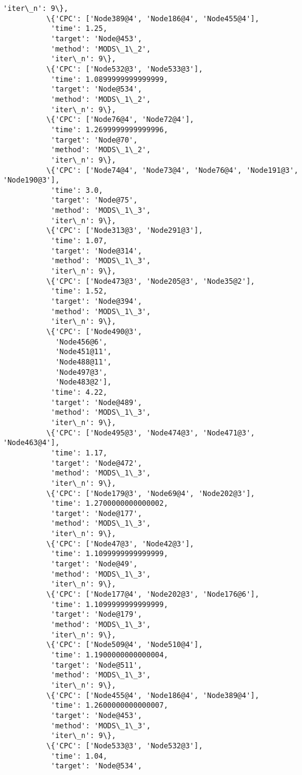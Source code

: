 \documentclass[11pt]{article}
\begin{document}
\begin{Verbatim}[commandchars=\\\{\}]
           'iter\_n': 9\},
          \{'CPC': ['Node389@4', 'Node186@4', 'Node455@4'],
           'time': 1.25,
           'target': 'Node@453',
           'method': 'MODS\_1\_2',
           'iter\_n': 9\},
          \{'CPC': ['Node532@3', 'Node533@3'],
           'time': 1.0899999999999999,
           'target': 'Node@534',
           'method': 'MODS\_1\_2',
           'iter\_n': 9\},
          \{'CPC': ['Node76@4', 'Node72@4'],
           'time': 1.2699999999999996,
           'target': 'Node@70',
           'method': 'MODS\_1\_2',
           'iter\_n': 9\},
          \{'CPC': ['Node74@4', 'Node73@4', 'Node76@4', 'Node191@3', 'Node190@3'],
           'time': 3.0,
           'target': 'Node@75',
           'method': 'MODS\_1\_3',
           'iter\_n': 9\},
          \{'CPC': ['Node313@3', 'Node291@3'],
           'time': 1.07,
           'target': 'Node@314',
           'method': 'MODS\_1\_3',
           'iter\_n': 9\},
          \{'CPC': ['Node473@3', 'Node205@3', 'Node35@2'],
           'time': 1.52,
           'target': 'Node@394',
           'method': 'MODS\_1\_3',
           'iter\_n': 9\},
          \{'CPC': ['Node490@3',
            'Node456@6',
            'Node451@11',
            'Node488@11',
            'Node497@3',
            'Node483@2'],
           'time': 4.22,
           'target': 'Node@489',
           'method': 'MODS\_1\_3',
           'iter\_n': 9\},
          \{'CPC': ['Node495@3', 'Node474@3', 'Node471@3', 'Node463@4'],
           'time': 1.17,
           'target': 'Node@472',
           'method': 'MODS\_1\_3',
           'iter\_n': 9\},
          \{'CPC': ['Node179@3', 'Node69@4', 'Node202@3'],
           'time': 1.2700000000000002,
           'target': 'Node@177',
           'method': 'MODS\_1\_3',
           'iter\_n': 9\},
          \{'CPC': ['Node47@3', 'Node42@3'],
           'time': 1.1099999999999999,
           'target': 'Node@49',
           'method': 'MODS\_1\_3',
           'iter\_n': 9\},
          \{'CPC': ['Node177@4', 'Node202@3', 'Node176@6'],
           'time': 1.1099999999999999,
           'target': 'Node@179',
           'method': 'MODS\_1\_3',
           'iter\_n': 9\},
          \{'CPC': ['Node509@4', 'Node510@4'],
           'time': 1.1900000000000004,
           'target': 'Node@511',
           'method': 'MODS\_1\_3',
           'iter\_n': 9\},
          \{'CPC': ['Node455@4', 'Node186@4', 'Node389@4'],
           'time': 1.2600000000000007,
           'target': 'Node@453',
           'method': 'MODS\_1\_3',
           'iter\_n': 9\},
          \{'CPC': ['Node533@3', 'Node532@3'],
           'time': 1.04,
           'target': 'Node@534',

\end{Verbatim}
\end{document}

